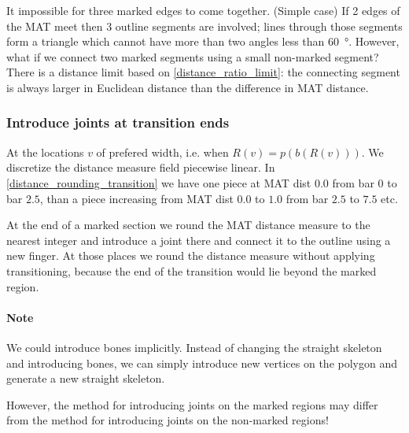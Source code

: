 It impossible for three marked edges to come together.
(Simple case) If 2 edges of the MAT meet then 3 outline segments are involved; lines through those segments form a triangle which cannot have more than two angles less than \SI{60}{\degree}.
However, what if we connect two marked segments using a small non-marked segment?
There is a distance limit based on \cref{distance_ratio_limit}:
the connecting segment is always larger in Euclidean distance than the difference in MAT distance.




\subsubsection{Introduce joints at transition ends}
At the locations $v$ of prefered width, i.e. when $R(v) = p(b(R(v)))$.
We discretize the distance measure field piecewise linear.
In \cref{distance_rounding_transition} we have one piece at MAT dist $0.0$ from bar $0$ to bar $2.5$, than a piece increasing from MAT dist $0.0$ to $1.0$ from bar $2.5$ to $7.5$ etc.

At the end of a marked section we round the MAT distance measure to the nearest integer and introduce a joint there and connect it to the outline using a new finger.
At those places we round the distance measure without applying transitioning, because the end of the transition would lie beyond the marked region.
 
\paragraph{Note}
We could introduce bones implicitly.
Instead of changing the straight skeleton and introducing bones,
we can simply introduce new vertices on the polygon and generate a new straight skeleton.

However, the method for introducing joints on the marked regions may differ from the method for introducing joints on the non-marked regions!


